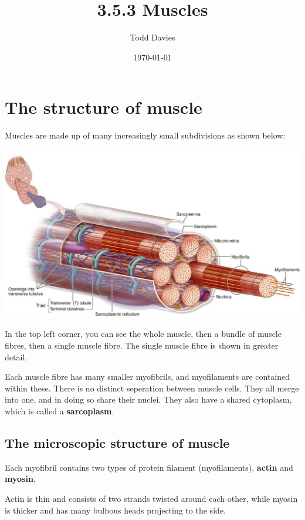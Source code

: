 \documentclass{article}
\title{3.5.3 Muscles}
\author{Todd Davies}
\date{\today}
\begin{document}
\lhead{\today}

\maketitle

\section*{The structure of muscle}
\thispagestyle{empty}

Muscles are made up of many increasingly small subdivisions as shown below:

\begin{center}
	\includegraphics[scale=0.35]{sceletal_muscle}
\end{center}

In the top left corner, you can see the whole muscle, then a bundle of muscle
fibres, then a single muscle fibre. The single muscle fibre is shown in greater
detail.

Each muscle fibre has many smaller myofibrils, and myofilaments are contained
within these. There is no distinct seperation between muscle cells. They all
merge into one, and in doing so share their nuclei. They also have a shared
cytoplasm, which is called a {\bf sarcoplasm}.

\subsection*{The microscopic structure of muscle}

Each myofibril contains two types of protein filament (myofilaments), {\bf
actin} and {\bf myosin}.

Actin is thin and consists of two strands twisted around each other, while
myosin is thicker and has many bulbous heads projecting to the side.
\end{document}

